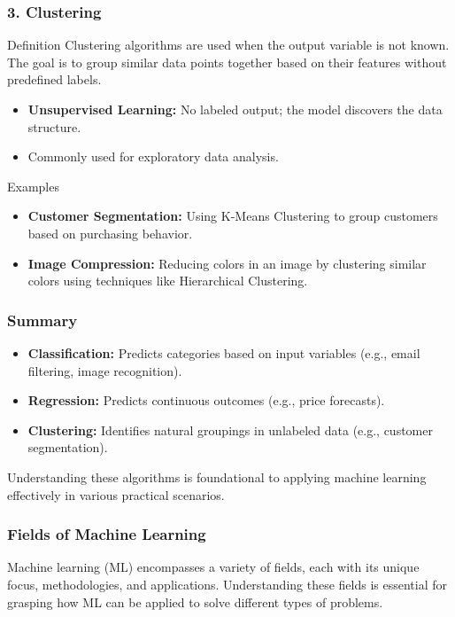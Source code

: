 \documentclass[aspectratio=169]{beamer}
\begin{document}
\begin{frame}[fragile]
    \frametitle{3. Clustering}
    \begin{block}{Definition}
        Clustering algorithms are used when the output variable is not known. The goal is to group similar data points together based on their features without predefined labels.
    \end{block}
    
    \begin{itemize}
        \item \textbf{Unsupervised Learning:} No labeled output; the model discovers the data structure.
        \item Commonly used for exploratory data analysis.
    \end{itemize}

    \begin{block}{Examples}
        \begin{itemize}
            \item \textbf{Customer Segmentation:} Using K-Means Clustering to group customers based on purchasing behavior.
            \item \textbf{Image Compression:} Reducing colors in an image by clustering similar colors using techniques like Hierarchical Clustering.
        \end{itemize}
    \end{block}
\end{frame}

\begin{frame}[fragile]
    \frametitle{Summary}
    \begin{itemize}
        \item \textbf{Classification:} Predicts categories based on input variables (e.g., email filtering, image recognition).
        \item \textbf{Regression:} Predicts continuous outcomes (e.g., price forecasts).
        \item \textbf{Clustering:} Identifies natural groupings in unlabeled data (e.g., customer segmentation).
    \end{itemize}
    
    Understanding these algorithms is foundational to applying machine learning effectively in various practical scenarios.
\end{frame}

\begin{frame}[fragile]
    \frametitle{Fields of Machine Learning}
    Machine learning (ML) encompasses a variety of fields, each with its unique focus, methodologies, and applications. 
    Understanding these fields is essential for grasping how ML can be applied to solve different types of problems.
\end{frame}
\end{document}
